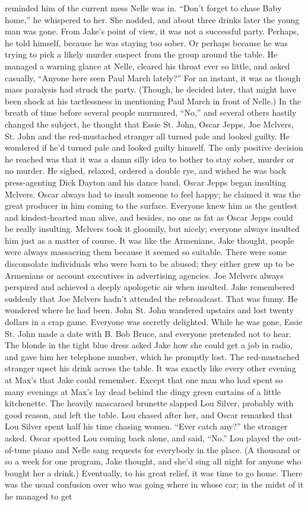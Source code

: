 \documentclass{novel}
\begin{document}
reminded him of the current mess Nelle was in. “Don’t forget to chase Baby home,” he whispered to her. She nodded, and about three drinks later the young man was gone. From Jake’s point of view, it was not a successful party. Perhaps, he told himself, because he was staying too sober. Or perhaps because he was trying to pick a likely murder suspect from the group around the table. He managed a warning glance at Nelle, cleared his throat ever so little, and asked casually, “Anyone here seen Paul March lately?” For an instant, it was as though mass paralysis had struck the party. (Though, he decided later, that might have been shock at his tactlessness in mentioning Paul March in front of Nelle.) In the breath of time before several people murmured, “No,” and several others hastily changed the subject, he thought that Essie St. John, Oscar Jepps, Joe Mclvers, St. John and the red-mustached stranger all turned pale and looked guilty. He wondered if he’d turned pale and looked guilty himself. The only positive decision he reached was that it was a damn silly idea to bother to stay sober, murder or no murder. He sighed, relaxed, ordered a double rye, and wished he was back press-agenting Dick Dayton and his dance band. Oscar Jepps began insulting Mclvers. Oscar always had to insult someone to feel happy; he claimed it was the great producer in him coming to the surface. Everyone knew him as the gentlest and kindest-hearted man alive, and besides, no one as fat as Oscar Jepps could be really insulting. Mclvers took it gloomily, but nicely; everyone always insulted him just as a matter of course. It was like the Armenians, Jake thought, people were always massacring them because it seemed so suitable. There were some disconsolate individuals who were born to be abused; they either grew up to be Armenians or account executives in advertising agencies. Joe Mclvers always perspired and achieved a deeply apologetic air when insulted. Jake remembered suddenly that Joe Mclvers hadn’t attended the rebroadcast. That was funny. He wondered where he had been. John St. John wandered upstairs and lost twenty dollars in a crap game. Everyone was secretly delighted. While he was gone, Essie St. John made a date with B. Bob Bruce, and everyone pretended not to hear. The blonde in the tight blue dress asked Jake how she could get a job in radio, and gave him her telephone number, which he promptly lost. The red-mustached stranger upset his drink across the table. It was exactly like every other evening at Max’s that Jake could remember. Except that one man who had spent so many evenings at Max’s lay dead behind the dingy green curtains of a little kitchenette. The heavily mascaraed brunette slapped Lou Silver, probably with good reason, and left the table. Lou chased after her, and Oscar remarked that Lou Silver spent half his time chasing women. “Ever catch any?” the stranger asked. Oscar spotted Lou coming back alone, and said, “No.” Lou played the out-of-tune piano and Nelle sang requests for everybody in the place. (A thousand or so a week for one program, Jake thought, and she’d sing all night for anyone who bought her a drink.) Eventually, to his great relief, it was time to go home. There was the usual confusion over who was going where in whose car; in the midst of it he managed to get 
\end{document}
